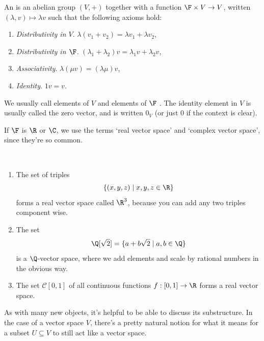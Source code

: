 \begin{definition}
    An  is an abelian group $(V, +)$ together with a function $\F \times V \rightarrow V$, written $(\lambda, v) \mapsto \lambda v$ such that the following axioms hold:
    \begin{enumerate}[label=(\roman*)]
        \item \emph{Distributivity in $V$}. $\lambda(v_1 + v_2) = \lambda v_1 + \lambda v_2$,
        \item \emph{Distributivity in $\F$}. $(\lambda_1 + \lambda_2)v = \lambda_1 v + \lambda_2 v$,
        \item \emph{Associativity}. $\lambda(\mu v) = (\lambda \mu) v$,
        \item \emph{Identity}. $1v = v$.
    \end{enumerate} 
\end{definition}

We usually call elements of $V$  and elements of $\F$ . The identity element in $V$ is usually called the zero vector, and is written $0_V$ (or just $0$ if the context is clear).

If $\F$ is $\R$ or $\C$, we use the terms `real vector space' and `complex vector space', since they're so common. 


\begin{example}~
    \vspace{-1.5\baselineskip}
    \begin{enumerate}[label=(\roman*)]
        
        \item The set of triples
        $$
        \{(x, y, z) \mid x, y, z \in \R\}
        $$ 
        forms a real vector space called $\R^3$, because you can add any two triples component wise. 
        \item The set
        $$
        \Q[\sqrt{2}] = \{a + b\sqrt{2} \mid a, b \in \Q\}
        $$
        is a $\Q$-vector space, where we add elements and scale by rational numbers in the obvious way.
        \item The set $\mathcal{C}[0, 1]$ of all continuous functions $f: [0, 1] \rightarrow \R$ forms a real vector space.
    \end{enumerate}
\end{example}

As with many new objects, it's helpful to be able to discuss its substructure. In the case of a vector space $V$, there's a pretty natural notion for what it means for a subset $U \subseteq V$ to still act like a vector space.

